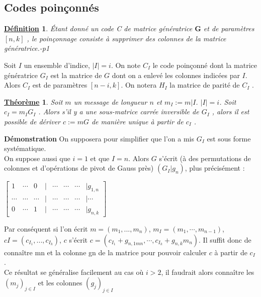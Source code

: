 \documentclass[12pt,openany]{report}
\newtheorem{theorem}{\underline{Théorème}}
\newtheorem{definition}{\underline{Définition}}
\begin{document}
\subsection{Codes poinçonnés}
\begin{definition} Étant donné un code C de matrice génératrice $ \mathbf{G}$ et de paramètres $[n, k]$ , le poinçonnage consiste à supprimer des colonnes de la matrice génératrice.\cite{Ghazal}-p1

\end{definition}
Soit $\mathit{I}$ un ensemble d’indice, $ \mid \mathit{I} \mid = i$. On note $\mathit{C}_I$ le code poinçonné dont la
matrice génératrice $\mathit{G}_I $ est la matrice de $\mathit{G}$ dont on a enlevé les colonnes indicées
par $ \mathit{I}$. Alors $\mathit{C}_I$ est de paramètres $[n-i, k]$. On notera $\mathit{H}_I$ la matrice de parité
de $\mathit{C}_I$ .
\begin{theorem} Soit $m$ un message de longueur $n$ et $m_I := m|I$. $\mid \mathit{I} \mid = i$. Soit $c_I = m_I \mathit{G}_I$ . Alors s’il y a une sous-matrice carrée inversible de $G_I$ , alors il est possible de dériver $c := mG$ de manière unique à partir de $c_I$ .\cite{Ghazal}

\end{theorem}
\textbf{Démonstration} On supposera pour simplifier que l’on a mis $G_I$ est sous forme systématique.\\
On suppose aussi que $i = 1$ et que $\mathit{I} = {n}$.
Alors $G$ s’écrit (à des permutations de colonnes et d’opérations de pivot de Gauss près) $(G_I |g_n)$, plus précisément :\\
\begin{center}

$\begin{bmatrix}
1 & \cdots & 0& | & \cdots& \cdots &\cdots&|g_{1,n}\\
\cdots & \cdots & \cdots& | & \cdots& \cdots &\cdots&|\cdots\\
0 & \cdots & 1& | & \cdots& \cdots &\cdots&|g_{n,k}
\end{bmatrix}$ 

\end{center}

Par conséquent si l’on écrit $m = (m_1, ..., m_n)$, $m_I = (m_1, \cdots, m_{n-1})$, $cI =(c_{I_1}, ..., c_{I_k})$, $c$ s’écrit $c = (c_{I_1} + g_{n,1mn},\cdots, c_{I_k} + g_{n,k}m_n)$.
Il suffit donc de connaître mn et la colonne gn de la matrice pour pouvoir calculer
$c$ à partir de $c_I$ .\\
Ce résultat se généralise facilement au cas où $i>2$, il faudrait alors connaître
les $(m_j)_{j \in I }$ et les colonnes $(g_j )_{j\in I}$ 
\end{document}
